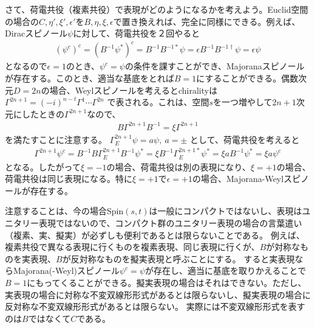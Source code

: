 \documentclass[12pt,a4paper,dvipdfmx]{jlreq}
\begin{document}
さて、荷電共役（複素共役）で表現がどのようになるかを考えよう。Euclid空間の場合の$C,\eta',\xi',\epsilon'$を$B,\eta,\xi,\epsilon$で置き換えれば、完全に同様にできる。例えば、Diracスピノール$\psi$に対して、荷電共役を２回やると
\begin{align*}
  (\psi^c)^c=(B^{-1}\psi^{*})^c
  =B^{-1}B^{-1*}\psi
  =\epsilon B^{-1}B^{-1\dag}\psi
  =\epsilon \psi
\end{align*}
となるので$\epsilon=1$のとき、$\psi^c=\psi$の条件を課すことができ、Majoranaスピノールが存在する。このとき、適当な基底をとれば$B=1$にすることができる。偶数次元$D=2n$の場合、Weylスピノールを考えるとchiralityは$\Gamma^{2n+1}=(-i)^{n-t}\Gamma^{1}\cdots \Gamma^{2n}$
で表される。これは、空間$s$を一つ増やして$2n+1$次元にしたときの$\Gamma^{2n+1}$なので、
\begin{align*}
  B\Gamma^{2n+1}B^{-1}=\xi\Gamma^{2n+1}
\end{align*}
を満たすことに注意する。
$\Gamma_E^{2n+1}\psi=a\psi,\ a=\pm$ として、荷電共役を考えると
\begin{align*}
  \Gamma^{2n+1}\psi^c 
  = B^{-1}B\Gamma_E^{2n+1}B^{-1} \psi^{*}
  = \xi B^{-1}\Gamma_E^{2n+1 *} \psi^{*}
  =\xi a B^{-1}\psi^{*}
  =\xi a \psi^c 
\end{align*}
となる。したがって$\xi=-1$の場合、荷電共役は別の表現になり、$\xi=+1$の場合、荷電共役は同じ表現になる。特に$\xi=+1$で$\epsilon=+1$の場合、Majorana-Weylスピノールが存在する。

注意することは、今の場合Spin$(s,t)$は一般にコンパクトではないし、表現はユニタリー表現ではないので、コンパクト群のユニタリー表現の場合の言葉遣い（複素、実、擬実）が必ずしも便利であるとは限らないことである。
例えば、複素共役で異なる表現に行くものを複素表現、同じ表現に行くが、$B$が対称なものを実表現、$B$が反対称なものを擬実表現と呼ぶことにする。
すると実表現ならMajorana(-Weyl)スピノール$\psi^c=\psi$が存在し、適当に基底を取りかえることで$B=1$にもってくることができる。擬実表現の場合はそれはできない。ただし、実表現の場合に対称な不変双線形形式があるとは限らないし、擬実表現の場合に反対称な不変双線形形式があるとは限らない。
実際には不変双線形形式を表すのは$B$ではなくて$C$である。
\end{document}
